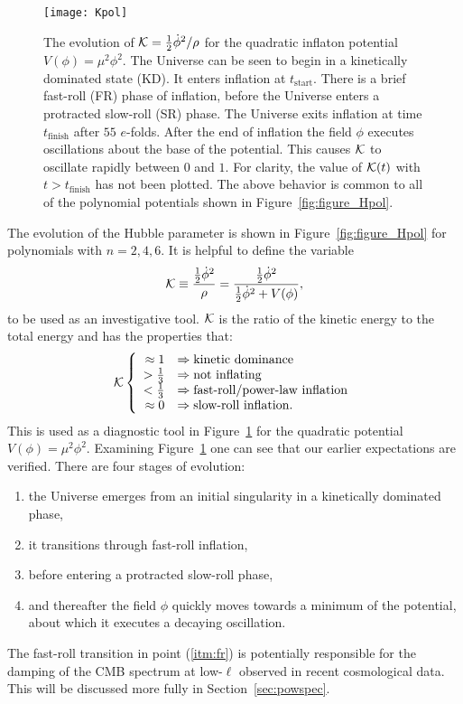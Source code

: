 %
\begin{figure}
  \texttt{[image: Kpol]} 
  \caption{The evolution of $\mathcal{K} = \frac{1}{2}\dot{\phi}^2/\rho$ for the quadratic inflaton potential $V(\phi) = \mu^2 \phi^2$.  The Universe can be seen to begin in a kinetically dominated state (KD).  It enters inflation at $t_\mathrm{start}$. There is a brief fast-roll (FR) phase of inflation, before the Universe enters a protracted slow-roll (SR) phase. The Universe exits inflation at time $t_\mathrm{finish}$ after $55$ $e$-folds. After the end of inflation the field $\phi$ executes oscillations about the base of the potential. This causes $\mathcal{K}$ to oscillate rapidly between $0$ and $1$. For clarity, the value of $\mathcal{K}(t)$ with $t>t_\mathrm{finish}$ has not been plotted. The above behavior is common to all of the  polynomial potentials shown in Figure~\protect\ref{fig:figure_Hpol}.  }
    \label{fig:figure_Kpol}
\end{figure}
%

The evolution of the Hubble parameter is shown in Figure~\ref{fig:figure_Hpol} for polynomials with $n=2,4,6$. It is helpful to define the variable
%
\begin{equation}
  \mathcal{K} 
  \equiv  
  \frac{\frac{1}{2}\dot{\phi}^2  }{\rho}  
  =  
  \frac{\frac{1}{2}\dot{\phi}^2  }
  {\frac{1}{2}\dot{\phi}^2 + V(\phi)},
\end{equation}
%
to be used as an investigative tool. $\mathcal{K}$ is the ratio of the kinetic energy to the total energy and has the properties that:
%
\begin{equation}
  \Kfrac 
    \left\{
    \begin{array}{rl}
      \approx 1 &\Rightarrow \hbox{kinetic dominance} 
      \\
      >\frac{1}{3} &\Rightarrow \hbox{not inflating}
      \\
      <\frac{1}{3} &\Rightarrow \hbox{fast-roll/power-law inflation}
      \\
      \approx 0 &\Rightarrow \hbox{slow-roll inflation.}
    \end{array}
%
    \right.
\end{equation}
%
This is used as a diagnostic tool in Figure~\ref{fig:figure_Kpol} for the quadratic potential $V(\phi) = \mu^2\phi^2$. Examining Figure~\ref{fig:figure_Kpol} one can see that our earlier expectations are verified. There are four stages of evolution:
%
\begin{enumerate}
  \item the Universe emerges from an initial singularity in a
    kinetically dominated phase,
  \item it transitions through fast-roll inflation, \label{itm:fr}
  \item before entering a protracted slow-roll phase, 
  \item and thereafter the field $\phi$ quickly moves towards a minimum of the potential, about which it executes a decaying oscillation.
\end{enumerate}
%
The fast-roll transition in point (\ref{itm:fr}) is potentially responsible for the damping of the CMB spectrum at low-$\ell$ observed in recent cosmological data. This will be discussed more fully in Section~\ref{sec:powspec}.


